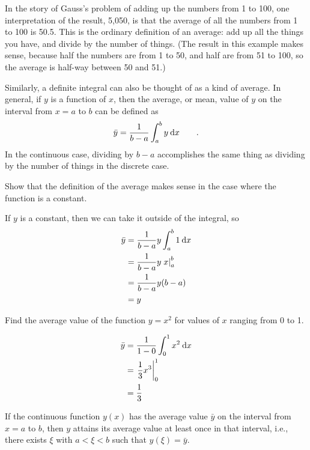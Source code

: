 In the story of Gauss's problem of adding up the numbers from 1 to 100, one interpretation of
the result, 5,050, is that the average of all the numbers from 1 to 100 is 50.5. This is the
ordinary definition of an average: add up all the things you have, and divide by the number
of things. (The result in this example makes sense, because half the numbers
are from 1 to 50, and half are from 51 to 100, so the average is half-way between 50 and 51.)

Similarly, a definite integral can also be thought of as a kind of average. In general, if $y$ is
a function of $x$, then the average, or mean, value of $y$ on the interval from $x=a$ to $b$ can be
defined as
\begin{equation*}
  \bar{y} = \frac{1}{b-a} \int_a^b y\:\textup{d} x \qquad .
\end{equation*}
In the continuous case, dividing by $b-a$ accomplishes the same thing as dividing by the
number of things in the discrete case.

\begin{eg}
\egquestion Show that the definition of the average makes sense in the case where the function
is a constant.

\eganswer If $y$ is a constant, then we can take it outside of the integral, so
\begin{align*}
  \bar{y} &= \frac{1}{b-a} y \int_a^b 1\:\textup{d} x \\
                     &= \frac{1}{b-a} y \left.x\right|_a^b \\
                     &= \frac{1}{b-a} y (b-a) \\
                     &= y
\end{align*}
\end{eg}

\begin{eg}\label{eg:mean-of-square}
\egquestion Find the average value of the function $y=x^2$ for values of $x$ ranging from
0 to 1.

\begin{align*}
  \bar{y} &= \frac{1}{1-0} \int_0^1 x^2\:\textup{d} x \\
                     &= \left.\frac{1}{3}x^3\right|_0^1 \\
                     &= \frac{1}{3}
\end{align*}
\end{eg}

\begin{important}\label{mean-value-theorem-stated}
If the continuous function $y(x)$ has the average value $\bar{y}$ on the interval
from $x=a$ to $b$, then $y$ attains its average value at least once in that interval,
i.e., there exists $\xi$ with $a<\xi<b$ such that $y(\xi)=\bar{y}$.
\end{important}


